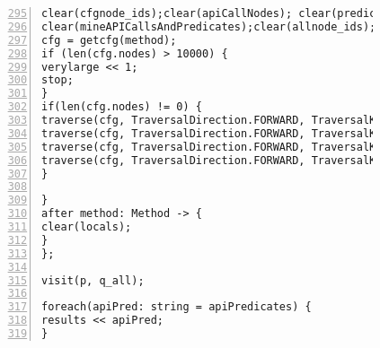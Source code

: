\begin{figure}[ht!]
\begin{lstlisting}[numbers=left, tabsize=4, escapechar=@, caption={API Precondition Mining Analysis},label={lst:apm-code}, firstline = 295, firstnumber = 295, lastline = 355]
clear(cfgnode_ids);clear(apiCallNodes); clear(predicateExprsAtNodes);
clear(mineAPICallsAndPredicates);clear(allnode_ids);clear(cfg_dom); clear(dom_result);
cfg = getcfg(method);
if (len(cfg.nodes) > 10000) {
verylarge << 1;
stop;
}
if(len(cfg.nodes) != 0) {
traverse(cfg, TraversalDirection.FORWARD, TraversalKind.HYBRID, mineAPICallsAndPredicates);
traverse(cfg, TraversalDirection.FORWARD, TraversalKind.HYBRID, allnode_ids);
traverse(cfg, TraversalDirection.FORWARD, TraversalKind.HYBRID, cfg_dom, fixp1);
traverse(cfg, TraversalDirection.FORWARD, TraversalKind.HYBRID, dom_result);
}

}
after method: Method -> {
clear(locals);    
}
};

visit(p, q_all);

foreach(apiPred: string = apiPredicates) {
results << apiPred;                
}
\end{lstlisting}
\end{figure}